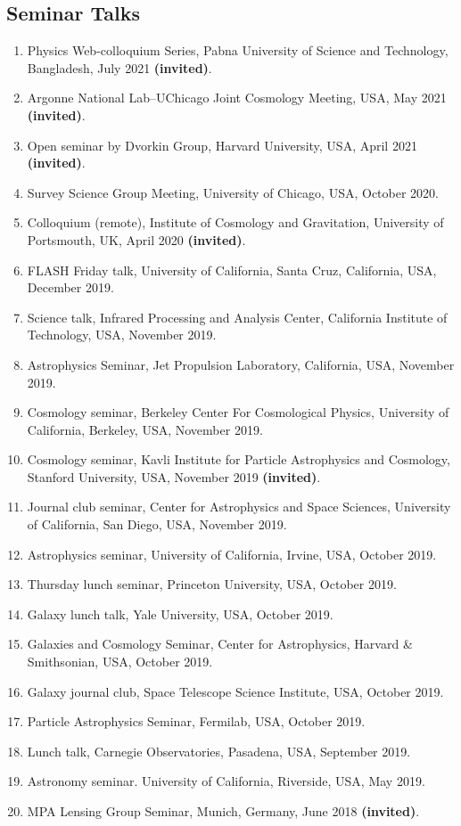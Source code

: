 \documentclass[margin, line]{res}
\begin{document}
\begin{resume}
\section{\sc Seminar Talks}
\begin{enumerate}
	\item Physics Web-colloquium Series, Pabna University of Science and Technology, Bangladesh, July 2021 \textbf{(invited)}.
	\item Argonne National Lab--UChicago Joint Cosmology Meeting, USA, May 2021 \textbf{(invited)}.
	\item Open seminar by Dvorkin Group, Harvard University, USA, April 2021 \textbf{(invited)}.
	\item Survey Science Group Meeting, University of Chicago, USA, October 2020.
	\item Colloquium (remote), Institute of Cosmology and Gravitation, University of Portsmouth, UK, April 2020 \textbf{(invited)}.
	\item FLASH Friday talk, University of California, Santa Cruz, California, USA, December 2019.
	\item Science talk, Infrared Processing and Analysis Center, California Institute of Technology, USA, November 2019.
	\item Astrophysics Seminar, Jet Propulsion Laboratory, California, USA, November 2019.
	\item Cosmology seminar, Berkeley Center For Cosmological Physics, University of California, Berkeley, USA, November 2019. 
	\item Cosmology seminar, Kavli Institute for Particle Astrophysics and Cosmology, Stanford University, USA, November 2019 \textbf{(invited)}.
	\item Journal club seminar, Center for Astrophysics and Space Sciences, University of California, San Diego, USA, November 2019.
	\item Astrophysics seminar, University of California, Irvine, USA, October 2019.
	\item Thursday lunch seminar, Princeton University, USA, October 2019.
	\item Galaxy lunch talk, Yale University, USA, October 2019.
	\item Galaxies and Cosmology Seminar, Center for Astrophysics, Harvard \& Smithsonian, USA, October 2019.
	\item Galaxy journal club, Space Telescope Science Institute, USA, October 2019.
	\item Particle Astrophysics Seminar, Fermilab, USA, October 2019.
	\item Lunch talk, Carnegie Observatories, Pasadena, USA, September 2019.
	\item Astronomy seminar. University of California, Riverside, USA, May 2019. 
	\item MPA Lensing Group Seminar, Munich, Germany, June 2018 \textbf{(invited)}.
\end{enumerate}



\end{resume}
\end{document}
